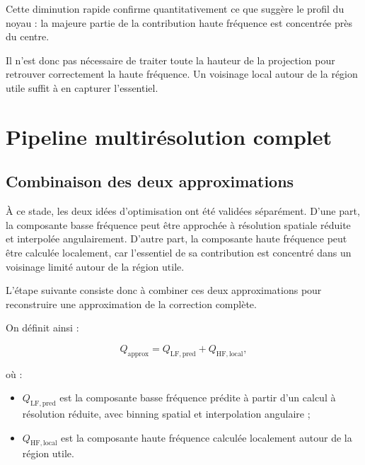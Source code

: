 \documentclass[11pt,a4paper]{report}
\begin{document}
Cette diminution rapide confirme quantitativement ce que suggère le profil
du noyau : la majeure partie de la contribution haute fréquence est
concentrée près du centre.

Il n'est donc pas nécessaire de traiter toute la hauteur de la projection
pour retrouver correctement la haute fréquence. Un voisinage local autour
de la région utile suffit à en capturer l'essentiel.


\chapter{Pipeline multirésolution complet}

\section{Combinaison des deux approximations}

À ce stade, les deux idées d'optimisation ont été validées séparément.
D'une part, la composante basse fréquence peut être approchée à résolution
spatiale réduite et interpolée angulairement. D'autre part, la composante
haute fréquence peut être calculée localement, car l'essentiel de sa
contribution est concentré dans un voisinage limité autour de la région
utile.

L'étape suivante consiste donc à combiner ces deux approximations pour
reconstruire une approximation de la correction complète.

On définit ainsi :

\begin{equation}
Q_{\mathrm{approx}}
=
Q_{\mathrm{LF,pred}}
+
Q_{\mathrm{HF,local}},
\label{eq:qapprox}
\end{equation}

où :

\begin{itemize}

    \item $Q_{\mathrm{LF,pred}}$ est la composante basse fréquence prédite
    à partir d'un calcul à résolution réduite, avec binning spatial et
    interpolation angulaire ;

    \item $Q_{\mathrm{HF,local}}$ est la composante haute fréquence calculée
    localement autour de la région utile.

\end{itemize}
\end{document}
